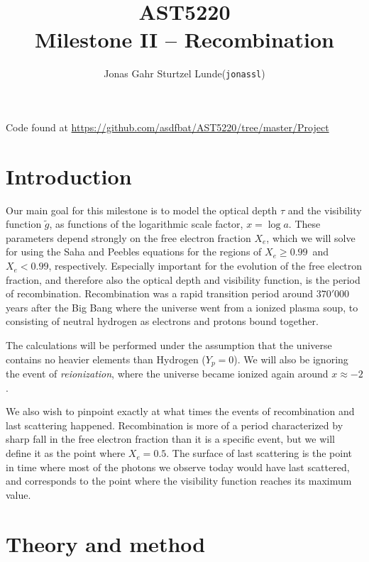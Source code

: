 \documentclass[10pt, a4paper]{article}
\begin{document}
\title{AST5220\\ Milestone II -- Recombination}
\author{
    \begin{tabular}{r l}
        Jonas Gahr Sturtzel Lunde & (\texttt{jonassl})
    \end{tabular}}

\maketitle
Code found at \url{https://github.com/asdfbat/AST5220/tree/master/Project}
\vspace{0.7cm}

\section{Introduction}
Our main goal for this milestone is to model the optical depth $\tau$ and the visibility function $\tilde{g}$, as functions of the logarithmic scale factor, $x = \log{a}$. These parameters depend strongly on the free electron fraction $X_e$, which we will solve for using the Saha and Peebles equations for the regions of $X_e \geq 0.99$ and $X_e < 0.99$, respectively. Especially important for the evolution of the free electron fraction, and therefore also the optical depth and visibility function, is the period of recombination. Recombination was a rapid transition period around $370'000$ years after the Big Bang where the universe went from a ionized plasma soup, to consisting of neutral hydrogen as electrons and protons bound together.

The calculations will be performed under the assumption that the universe contains no heavier elements than Hydrogen ($Y_p = 0$). We will also be ignoring the event of \textit{reionization}, where the universe became ionized again around $x\approx -2$.

We also wish to pinpoint exactly at what times the events of recombination and last scattering happened. Recombination is more of a period characterized by sharp fall in the free electron fraction than it is a specific event, but we will define it as the point where $X_e = 0.5$. The surface of last scattering is the point in time where most of the photons we observe today would have last scattered, and corresponds to the point where the visibility function reaches its maximum value.


\section{Theory and method}
\end{document}
